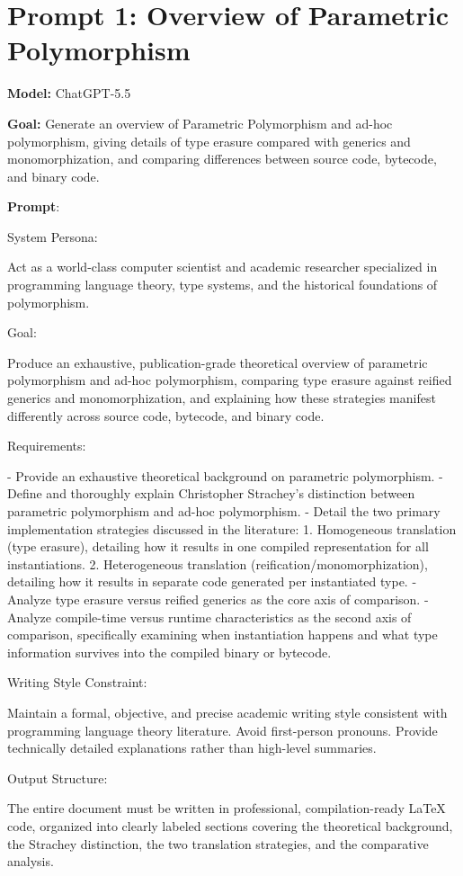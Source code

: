 \documentclass[11pt]{report}
\begin{document}
\section{Prompt 1: Overview of Parametric Polymorphism}

\noindent\textbf{Model:} ChatGPT-5.5

\vspace{0.5em}
\noindent\textbf{Goal:} Generate an overview of Parametric Polymorphism and ad-hoc polymorphism, giving details of type erasure compared with generics and monomorphization, and comparing differences between source code, bytecode, and binary code.

\vspace{0.5em}
\noindent\textbf{Prompt}:

\begin{PromptVerbatim}
System Persona:

Act as a world-class computer scientist and academic researcher specialized
in programming language theory, type systems, and the historical foundations
of polymorphism.

Goal:

Produce an exhaustive, publication-grade theoretical overview of parametric
polymorphism and ad-hoc polymorphism, comparing type erasure against
reified generics and monomorphization, and explaining how these strategies
manifest differently across source code, bytecode, and binary code.

Requirements:

- Provide an exhaustive theoretical background on parametric polymorphism.
- Define and thoroughly explain Christopher Strachey's distinction between
  parametric polymorphism and ad-hoc polymorphism.
- Detail the two primary implementation strategies discussed in the
  literature:
  1. Homogeneous translation (type erasure), detailing how it results in
     one compiled representation for all instantiations.
  2. Heterogeneous translation (reification/monomorphization), detailing
     how it results in separate code generated per instantiated type.
- Analyze type erasure versus reified generics as the core axis of
  comparison.
- Analyze compile-time versus runtime characteristics as the second axis
  of comparison, specifically examining when instantiation happens and
  what type information survives into the compiled binary or bytecode.

Writing Style Constraint:

Maintain a formal, objective, and precise academic writing style consistent
with programming language theory literature. Avoid first-person pronouns.
Provide technically detailed explanations rather than high-level summaries.

Output Structure:

The entire document must be written in professional, compilation-ready
LaTeX code, organized into clearly labeled sections covering the
theoretical background, the Strachey distinction, the two translation
strategies, and the comparative analysis.
\end{PromptVerbatim}
\end{document}
